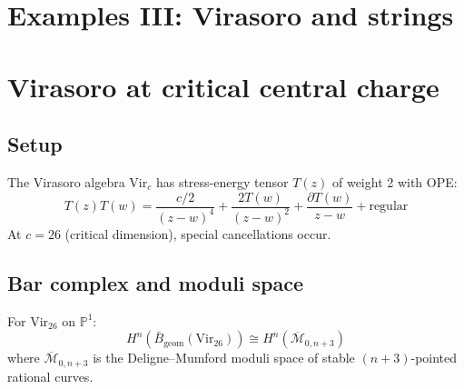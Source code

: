 \section{Examples III: Virasoro and strings}
 
\section{Virasoro at critical central charge}
 
\subsection{Setup}
 
\begin{definition}
The Virasoro algebra $\text{Vir}_c$ has stress-energy tensor $T(z)$ of weight 2 with OPE:
\[
T(z)T(w) = \frac{c/2}{(z-w)^4} + \frac{2T(w)}{(z-w)^2} + \frac{\partial T(w)}{z-w} + \text{regular}
\]
At $c = 26$ (critical dimension), special cancellations occur.
\end{definition}

\subsection{Bar complex and moduli space}
 
\begin{theorem}\label{thm:virasoro-moduli}
For $\text{Vir}_{26}$ on $\mathbb{P}^1$:
\[
H^n(\bar{B}_{\text{geom}}(\text{Vir}_{26})) \cong H^n(\overline{\mathcal{M}}_{0,n+3})
\]
where $\overline{\mathcal{M}}_{0,n+3}$ is the Deligne--Mumford moduli space of stable $(n+3)$-pointed rational curves.
\end{theorem}
 
